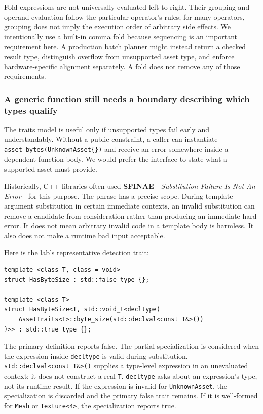 Fold expressions are not universally evaluated left-to-right. Their grouping and operand evaluation follow the particular operator's rules; for many operators, grouping does not imply the execution order of arbitrary side effects. We intentionally use a built-in comma fold because sequencing is an important requirement here. A production batch planner might instead return a checked result type, distinguish overflow from unsupported asset type, and enforce hardware-specific alignment separately. A fold does not remove any of those requirements.

\subsubsection{A generic function still needs a boundary describing which types qualify}\label{a-generic-function-still-needs-a-boundary-describing-which-types-qualify}

The traits model is useful only if unsupported types fail early and understandably. Without a public constraint, a caller can instantiate \texttt{asset\_bytes(UnknownAsset\{\})} and receive an error somewhere inside a dependent function body. We would prefer the interface to state what a supported asset must provide.

Historically, C++ libraries often used \textbf{SFINAE}---\emph{Substitution Failure Is Not An Error}---for this purpose. The phrase has a precise scope. During template argument substitution in certain immediate contexts, an invalid substitution can remove a candidate from consideration rather than producing an immediate hard error. It does not mean arbitrary invalid code in a template body is harmless. It also does not make a runtime bad input acceptable.

Here is the lab's representative detection trait:

\begin{verbatim}
template <class T, class = void>
struct HasByteSize : std::false_type {};

template <class T>
struct HasByteSize<T, std::void_t<decltype(
    AssetTraits<T>::byte_size(std::declval<const T&>())
)>> : std::true_type {};
\end{verbatim}

The primary definition reports false. The partial specialization is considered when the expression inside \texttt{decltype} is valid during substitution. \texttt{std::declval\textless{}const\ T\&\textgreater{}()} supplies a type-level expression in an unevaluated context; it does not construct a real \texttt{T}. \texttt{decltype} asks about an expression's type, not its runtime result. If the expression is invalid for \texttt{UnknownAsset}, the specialization is discarded and the primary false trait remains. If it is well-formed for \texttt{Mesh} or \texttt{Texture\textless{}4\textgreater{}}, the specialization reports true.

